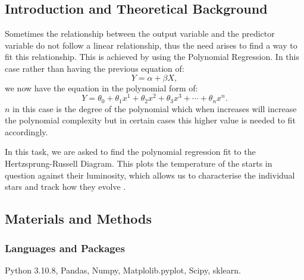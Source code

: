 \documentclass[12pt, a4paper]{article}
\begin{document}
\subsection{Introduction and Theoretical Background}
Sometimes the relationship between the output variable and the predictor variable do not follow a linear relationship, thus the need arises to find a way to fit this relationship. This is achieved by using the Polynomial Regression. In this case rather than having the previous equation of:
\begin{equation}
    Y = \alpha + \beta X ,
\end{equation}
we now have the equation in the polynomial form of:
\begin{equation}
    Y = \theta_0 + \theta_1 x^1+ \theta_2 x^2 + \theta_3 x^3 + \cdots + \theta_n x^n .
\end{equation}
\(n\) in this case is the degree of the polynomial which when increases will increase the polynomial complexity but in certain cases this higher value is needed to fit accordingly.

In this task, we are asked to find the polynomial regression fit to the Hertzsprung-Russell Diagram. This plots the temperature of the starts in question against their luminosity, which allows us to characterise the individual stars and track how they evolve \parencite{muncaster}.

\subsection{Materials and Methods}
\subsubsection{Languages and Packages}
Python 3.10.8, Pandas, Numpy, Matplolib.pyplot, Scipy, sklearn.
\end{document}
